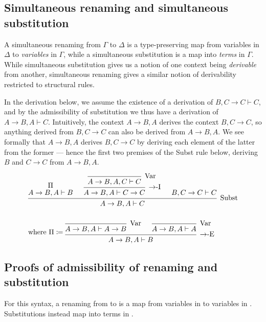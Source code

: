 \subsection{Simultaneous renaming and simultaneous substitution}

A simultaneous renaming from $\Gamma$ to $\Delta$ is a type-preserving map from
variables in $\Delta$ to \emph{variables} in $\Gamma$, while a simultaneous
substitution is a map into \emph{terms} in $\Gamma$.
While simultaneous substitution gives us a notion of one context being
\emph{derivable} from another, simultaneous renaming gives a similar notion
of derivability restricted to structural rules.

In the derivation below, we assume the existence of a derivation of
$B, C \to C \vdash C$, and by the admissibility of substitution we thus have a
derivation of $A \to B, A \vdash C$.
Intuitively, the context $A \to B, A$ derives the context $B, C \to C$, so
anything derived from $B, C \to C$ can also be derived from $A \to B, A$.
We see formally that $A \to B, A$ derives $B, C \to C$ by deriving each element
of the latter from the former --- hence the first two premises of the Subst
rule below, deriving $B$ and $C \to C$ from $A \to B, A$.

\begin{align*}
  &\begin{prooftree}
    \hypo{\Pi}
    \infer[no rule]1{A \to B, A \vdash B}
    \infer0[Var]{A \to B, A, C \vdash C}
    \infer1[$\to$-I]{A \to B, A \vdash C \to C}
    \hypo{B, C \to C \vdash C}
    \infer3[Subst]{A \to B, A \vdash C}
  \end{prooftree}
  \\\\
  &\textrm{where }\Pi \coloneqq
  \begin{prooftree}
    \infer0[Var]{A \to B, A \vdash A \to B}
    \infer0[Var]{A \to B, A \vdash A}
    \infer2[$\to$-E]{A \to B, A \vdash B}
  \end{prooftree}
\end{align*}

\subsection{Proofs of admissibility of renaming and substitution}

For this syntax, a renaming from \AgdaBound{$\Gamma$} to \AgdaBound{$\Delta$}
is a map from variables in \AgdaBound{$\Delta$} to variables in
\AgdaBound{$\Gamma$}.
Substitutions instead map into terms in \AgdaBound{$\Gamma$}.

